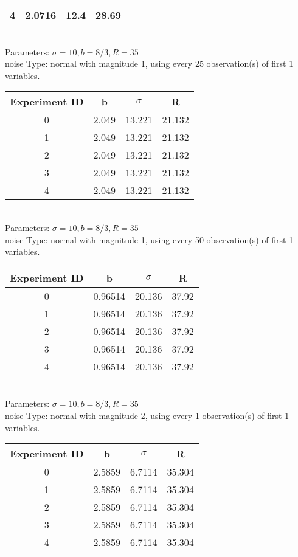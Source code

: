 \begin{multicols}{3}
\begin{tabular}{cccc}
 4 & 2.0716 & 12.4 & 28.69\\ \hline 
 \end{tabular}\\
Parameters: $\sigma=10, b=8/3, R=35$\\
noise Type: normal with magnitude 1, using every 25 observation(s) of first 1 variables.\\
\begin{tabular}{cccc}
\hline Experiment ID & b & $\sigma$ & R \\ \hline 
0 & 2.049 & 13.221 & 21.132\\ \hline 
 1 & 2.049 & 13.221 & 21.132\\ \hline 
 2 & 2.049 & 13.221 & 21.132\\ \hline 
 3 & 2.049 & 13.221 & 21.132\\ \hline 
 4 & 2.049 & 13.221 & 21.132\\ \hline 
 \end{tabular}\\
Parameters: $\sigma=10, b=8/3, R=35$\\
noise Type: normal with magnitude 1, using every 50 observation(s) of first 1 variables.\\
\begin{tabular}{cccc}
\hline Experiment ID & b & $\sigma$ & R \\ \hline 
0 & 0.96514 & 20.136 & 37.92\\ \hline 
 1 & 0.96514 & 20.136 & 37.92\\ \hline 
 2 & 0.96514 & 20.136 & 37.92\\ \hline 
 3 & 0.96514 & 20.136 & 37.92\\ \hline 
 4 & 0.96514 & 20.136 & 37.92\\ \hline 
 \end{tabular}\\
Parameters: $\sigma=10, b=8/3, R=35$\\
noise Type: normal with magnitude 2, using every 1 observation(s) of first 1 variables.\\
\begin{tabular}{cccc}
\hline Experiment ID & b & $\sigma$ & R \\ \hline 
0 & 2.5859 & 6.7114 & 35.304\\ \hline 
 1 & 2.5859 & 6.7114 & 35.304\\ \hline 
 2 & 2.5859 & 6.7114 & 35.304\\ \hline 
 3 & 2.5859 & 6.7114 & 35.304\\ \hline 
 4 & 2.5859 & 6.7114 & 35.304\\ \hline 

\end{tabular}
\end{multicols}
